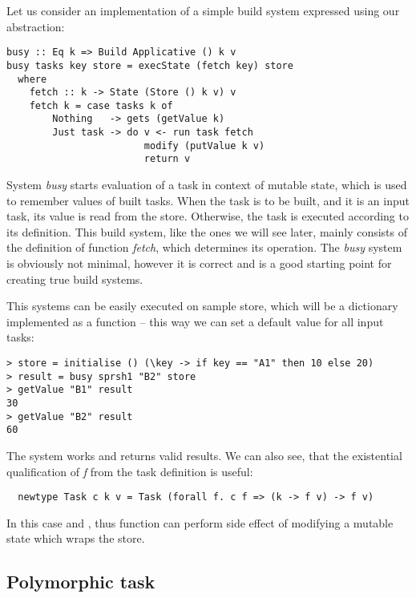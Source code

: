 \pagebreak

Let us consider an implementation of a simple build system expressed using our abstraction:

\begin{lstlisting}
busy :: Eq k => Build Applicative () k v
busy tasks key store = execState (fetch key) store
  where
    fetch :: k -> State (Store () k v) v
    fetch k = case tasks k of
        Nothing   -> gets (getValue k)
        Just task -> do v <- run task fetch
                        modify (putValue k v)
                        return v
\end{lstlisting}

System \textit{busy} starts evaluation of a task in context of mutable state, which is used to remember values of built tasks. When the task is to be built, and it is an input task, its value is read from the store. Otherwise, the task is executed according to its definition. This build system, like the ones we will see later, mainly consists of the definition of function \textit{fetch}, which determines its operation. The \textit{busy} system is obviously not minimal, however it is correct and is a good starting point for creating true build systems.

This systems can be easily executed on sample store, which will be a dictionary implemented as a function -- this way we can set a default value for all input tasks:

\begin{lstlisting}
> store = initialise () (\key -> if key == "A1" then 10 else 20)
> result = busy sprsh1 "B2" store
> getValue "B1" result
30
> getValue "B2" result
60
\end{lstlisting}

The system works and returns valid results. We can also see, that the existential qualification of \textit{f} from the task definition is useful:

\begin{lstlisting}
  newtype Task c k v = Task (forall f. c f => (k -> f v) -> f v)
\end{lstlisting}

In this case  and , thus function  can perform side effect of modifying a mutable state which wraps the store.

\subsection{Polymorphic task}

